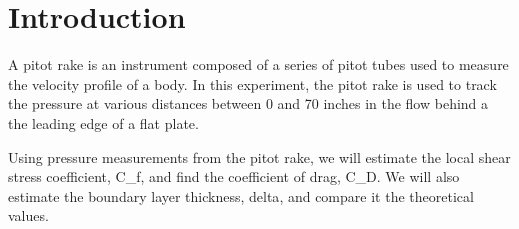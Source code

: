 \chapter{Introduction}
\label{cp:introduction}
A pitot rake is an instrument composed of a series of pitot tubes used to measure the velocity profile of a body. In this experiment, the pitot rake is used to track the pressure at various distances between 0 and 70 inches in the flow behind a the leading edge of a flat plate. 

Using pressure measurements from the pitot rake, we will estimate the local shear stress coefficient, \gls{C_f}, and find the coefficient of drag, \gls{C_D}. We will also estimate the boundary layer thickness, \gls{delta}, and compare it the theoretical values. 